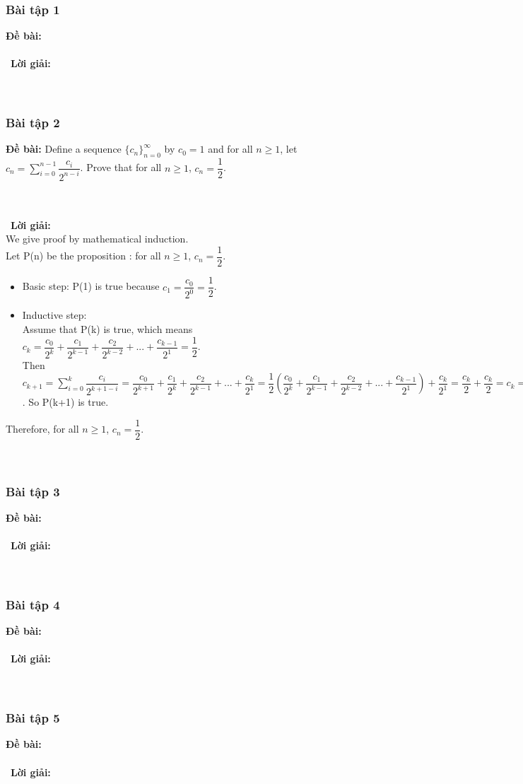 \documentclass[a4paper]{article}
\begin{document}
\subsubsection{Bài tập 1}
\textbf{Đề bài:} 
\\\ \\\
\textbf{Lời giải:} \\\ \\\
\clearpage
\subsubsection{Bài tập 2}
\textbf{Đề bài:} Define a sequence $\{c_{n}\}^{\infty}_{n=0}$ by $c_{0}=1$ and for all $n \geqslant 1$, let $c_{n}=\sum _{i=0}^{n-1}\dfrac{c_{i}}{2^{n-i}}$. Prove that for all $n \geqslant 1$, $c_{n}=\dfrac{1}{2}$.
 
\\\ \\\
\textbf{Lời giải:} \\We give proof by mathematical induction.
\\ Let P(n) be the proposition :  for all $n \geqslant 1$, $c_{n}=\dfrac{1}{2}$.
\begin{itemize}
\item Basic step: P(1) is true because $c_{1}=\dfrac{c_{0}}{2^{0}}=\dfrac{1}{2}$.
\item Inductive step:
\\Assume that P(k) is true, which means  $c_{k}=\dfrac{c_{0}}{2^{k}}+\dfrac{c_{1}}{2^{k-1}}+\dfrac{c_{2}}{2^{k-2}}+...+\dfrac{c_{k-1}}{2^{1}}=\dfrac{1}{2}$.
\\Then $c_{k+1}=\sum _{i=0}^{k}\dfrac{c_{i}}{2^{k+1-i}}=\dfrac{c_{0}}{2^{k+1}}+\dfrac{c_{1}}{2^{k}}+\dfrac{c_{2}}{2^{k-1}}+...+\dfrac{c_{k}}{2^{1}}=\dfrac{1}{2}(\dfrac{c_{0}}{2^{k}}+\dfrac{c_{1}}{2^{k-1}}+\dfrac{c_{2}}{2^{k-2}}+...+\dfrac{c_{k-1}}{2^{1}})+\dfrac{c_{k}}{2^{1}}=\dfrac{c_{k}}{2}+\dfrac{c_{k}}{2}=c_{k}=\dfrac{1}{2}$. So P(k+1) is true. 
\end{itemize}
Therefore, for all $n \geqslant 1$, $c_{n}=\dfrac{1}{2}$.  \\\ \\\
\clearpage
\subsubsection{Bài tập 3}
\textbf{Đề bài:} 
\\\ \\\
\textbf{Lời giải:} \\\ \\\
\clearpage
\subsubsection{Bài tập 4}
\textbf{Đề bài:} 
\\\ \\\
\textbf{Lời giải:} \\\ \\\
\clearpage
\subsubsection{Bài tập 5}
\textbf{Đề bài:} 
\\\ \\\
\textbf{Lời giải:} \\\ \\\
\clearpage

\clearpage
\end{document}
